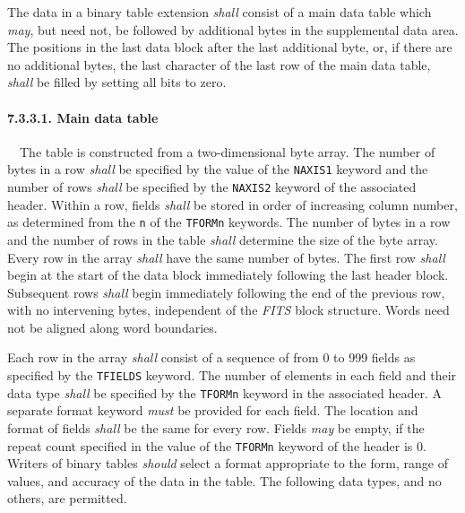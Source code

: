 \documentclass[onecolumn]{aa}
\begin{document}
   The data in a binary table extension {\em shall} consist of a 
   main data table which {\em may}, but need not, be followed by 
   additional bytes in the supplemental data area.  The positions in the last
   data block after the last additional byte, or, if there are no 
   additional bytes, the last character of the last row of the 
   main data table, {\em shall} be filled by setting all bits to zero.

   \paragraph{7.3.3.1. Main data table}
   \label{s:MbinT}
\ \newline \ \newline   The table is constructed from a two-dimensional byte array.
   The number of bytes in a row {\em shall} be specified by the value of 
   the {\tt NAXIS1} keyword and the number of rows {\em shall} be 
   specified by the {\tt NAXIS2} keyword
   of the associated header.  Within a row, fields {\em shall}
   be stored in order of increasing column number, as determined from
   the {\tt n} of the {\tt TFORMn} keywords. 
   The number of bytes in a row and the number of rows in the
   table {\em shall} determine the size of the byte array.  Every row
   in the array {\em shall} have the same number of bytes. The
   first row {\em shall} begin at the start of the data block
   immediately following the last header block. Subsequent rows 
   {\em shall} begin immediately following the
   end of the previous row, with no intervening bytes,
   independent of the {\em FITS\/} block structure.  Words need not
   be aligned along word boundaries.  
  
   Each row in the array {\em shall} consist of a sequence of from 0 to 999 fields
   as specified by the {\tt TFIELDS} keyword.
   The number of elements in each field and their data type {\em shall}
   be specified by the {\tt TFORMn} keyword in the associated header.  A
   separate format keyword {\em must} be provided for each field.  The
   location and format of fields {\em shall} be the same for every row.
   Fields {\em may} be empty, if the repeat 
   count specified in the value of the 
   {\tt TFORMn} keyword of the header is 0.  
   Writers of binary tables {\em should} select a format appropriate to the 
   form, range of values, and accuracy of the data in the table.    
   The following 
   data types, and no others, are permitted.
\end{document}
